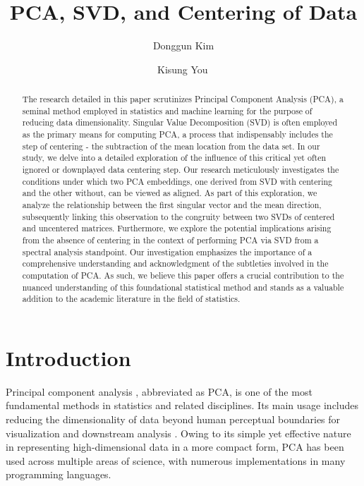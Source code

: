 \documentclass[11pt]{article}
\begin{document}
	
\title{PCA, SVD, and Centering of Data}
\author[1]{Donggun Kim}
\author[2]{Kisung You\,}
\date{}

\maketitle
\begin{abstract}


The research detailed in this paper scrutinizes Principal Component Analysis (PCA), a seminal method employed in statistics and machine learning for the purpose of reducing data dimensionality. Singular Value Decomposition (SVD) is often employed as the primary means for computing PCA, a process that indispensably includes the step of centering - the subtraction of the mean location from the data set. In our study, we delve into a detailed exploration of the influence of this critical yet often ignored or downplayed data centering step. Our research meticulously investigates the conditions under which two PCA embeddings, one derived from SVD with centering and the other without, can be viewed as aligned. As part of this exploration, we analyze the relationship between the first singular vector and the mean direction, subsequently linking this observation to the congruity between two SVDs of centered and uncentered matrices. Furthermore, we explore the potential implications arising from the absence of centering in the context of performing PCA via SVD from a spectral analysis standpoint. Our investigation emphasizes the importance of a comprehensive understanding and acknowledgment of the subtleties involved in the computation of PCA. As such, we believe this paper offers a crucial contribution to the nuanced understanding of this foundational statistical method and stands as a valuable addition to the academic literature in the field of statistics.
\end{abstract}



\pagebreak 
\section{Introduction}\label{sec:intro}




Principal component analysis \citep{pearson_1901_LIIILinesPlanes}, abbreviated as PCA, is one of the most fundamental methods in statistics and related disciplines. Its main usage includes reducing the dimensionality of data beyond human perceptual boundaries for visualization and downstream analysis \citep{joliffe_2002_PrincipalComponentAnalysis}. Owing to its simple yet effective nature in representing high-dimensional data in a more compact form, PCA has been used across multiple areas of science, with numerous implementations in many programming languages.
\end{document}
